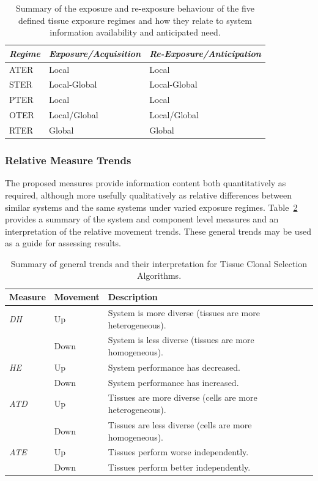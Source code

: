 \begin{table}[ht]
	\centering\small
		\begin{tabular}{lll}
		\toprule
		\emph{Regime} & \emph{Exposure/Acquisition} & \emph{Re-Exposure/Anticipation} \\ 
		\toprule
		ATER & Local & Local \\ 
		STER & Local-Global & Local-Global \\ 
		PTER & Local & Local \\ 
		OTER & Local/Global & Local/Global \\ 
		RTER & Global & Global \\
		\bottomrule
		\end{tabular}
	\caption{Summary of the exposure and re-exposure behaviour of the five defined tissue exposure regimes and how they relate to system information availability and anticipated need.}
	\label{tab:tissues:trends:exposure:behaviour}
\end{table}

%
%
\subsubsection{Relative Measure Trends}
The proposed measures provide information content both quantitatively as required, although more usefully qualitatively as relative differences between similar systems and the same systems under varied exposure regimes. Table~\ref{tab:tissue:measures:interpretation:trends} provides a summary of the system and component level measures and an interpretation of the relative movement trends. These general trends may be used as a guide for assessing results. 

\begin{table}[ht]
	\centering\small
		\begin{tabular}{lll}
		\toprule
		\textbf{Measure} & \textbf{Movement} & \textbf{Description} \\ 
		\toprule
		\emph{DH} & Up & System is more diverse (tissues are more heterogeneous). \\ 
		 					 & Down & System is less diverse (tissues are more homogeneous).\\ 
		\midrule
		\emph{HE} & Up & System performance has decreased. \\ 
		 					 & Down & System performance has increased. \\ 
		\midrule
		\emph{ATD} & Up  & Tissues are more diverse (cells are more heterogeneous). \\ 
		 					& Down & Tissues are less diverse (cells are more homogeneous). \\ 
		\midrule
		\emph{ATE} & Up & Tissues perform worse independently. \\ 
		 					 & Down & Tissues perform better independently. \\ 
		\bottomrule
		\end{tabular}
	\caption{Summary of general trends and their interpretation for Tissue Clonal Selection Algorithms.}
	\label{tab:tissue:measures:interpretation:trends}
\end{table}


